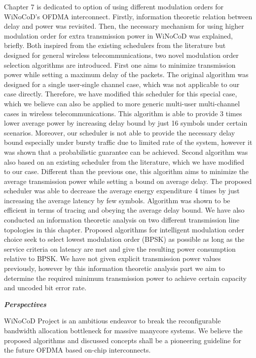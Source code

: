 Chapter 7 is dedicated to option of using different modulation orders for WiNoCoD's OFDMA interconnect. Firstly, information theoretic relation between delay and power was revisited. Then, the necessary mechanism for using higher modulation order for extra transmission power in WiNoCoD was explained, briefly. Both inspired from the existing schedulers from the literature but designed for general wireless telecommunications, two novel modulation order selection algorithms are introduced. First one aims to minimize transmission power while setting a maximum delay of the packets. The original algorithm was designed for a single user-single channel case, which was not applicable to our case directly. Therefore, we have modified this scheduler for this special case, which we believe can also be applied to more generic multi-user multi-channel cases in wireless telecommunications. This algorithm is able to provide 3 times lower average power by increasing delay bound by just 16 symbols under certain scenarios. Moreover, our scheduler is not able to provide the necessary delay bound especially under bursty traffic due to limited rate of the system, however it was shown that a probabilistic guarantee can be achieved. Second algorithm was also based on an existing scheduler from the literature, which we have modified to our case. Different than the previous one, this algorithm aims to minimize the average transmission power while setting a bound on average delay. The proposed scheduler was able to decrease the average energy expenditure 4 times by just increasing the average latency by few symbols. Algorithm was shown to be efficient in terms of tracing and obeying the average delay bound. We have also conducted an information theoretic analysis on two different transmission line topologies in this chapter. Proposed algorithms for intelligent modulation order choice seek to select lowest modulation order (BPSK) as possible as long as the service criteria on latency are met and give the resulting power consumption relative to BPSK. We have not given explicit transmission power values previously, however by this information theoretic analysis part we aim to determine the required minimum transmission power to achieve certain capacity and uncoded bit error rate.


\textit{\textbf{Perspectives}}

WiNoCoD Project is an ambitious endeavor to break the reconfigurable bandwidth allocation bottleneck for massive manycore systems. We believe the proposed algorithms and discussed concepts shall be a pioneering guideline for the future OFDMA based on-chip interconnects.

